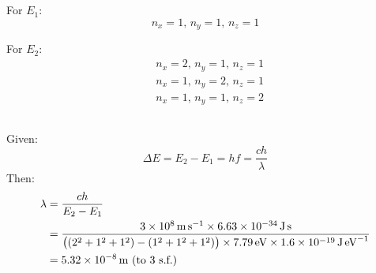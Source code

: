 \subsection{}
For $ E_1 $:
\begin{equation*}
    n_x = 1 \textrm{, } n_y = 1 \textrm{, } n_z  = 1
\end{equation*}

For $ E_2 $:
\begin{align*}
    & n_x = 2 \textrm{, } n_y = 1 \textrm{, } n_z  = 1\\
    & n_x = 1 \textrm{, } n_y = 2 \textrm{, } n_z  = 1\\
    & n_x = 1 \textrm{, } n_y = 1 \textrm{, } n_z  = 2
\end{align*}

\subsection{}
Given:
\begin{equation*}
    \Delta E = E_2 - E_1 = hf = \frac{ch}{\lambda}
\end{equation*}
Then:
\begin{align*}
    \lambda & = \frac{ch}{E_2 - E_1}\\
    & = \frac{\SI{3e8}{\metre\second\tothe{-1}} \times \SI{6.63e-34}{\joule\second}}{\del{\del{2^2 + 1^2 + 1^2} - \del{1^2 + 1^2 + 1^2}} \times \SI{7.79}{\electronvolt} \times \SI{1.6e-19}{\joule\electronvolt\tothe{-1}}}\\
    & = \SI{5.32e-8}{\metre} \textrm{ (to 3 s.f.)}
\end{align*}
